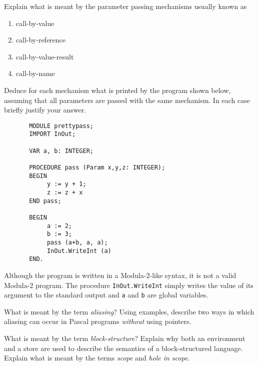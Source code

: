 \begin{questions}
\begin{subquestions}
\subquestion
        Explain what is meant by the parameter passing mechanisms usually
        known as
                \begin{enumerate}
                \item call-by-value
                \item call-by-reference
                \item call-by-value-result
                \item call-by-name
                \end{enumerate}
        Deduce for each mechanism what is printed by the 
        program shown below, assuming that all parameters are
	passed with the same mechanism.
        In each case briefly justify your answer.
\begin{verbatim}
       MODULE prettypass; 
       IMPORT InOut;

       VAR a, b: INTEGER;
 
       PROCEDURE pass (Param x,y,z: INTEGER);
       BEGIN
            y := y + 1;
            z := z + x
       END pass;
               
       BEGIN
            a := 2;
            b := 3;
            pass (a+b, a, a);
            InOut.WriteInt (a)
       END.
\end{verbatim}                   
Although the program is written in a Modula-2-like syntax, it
is not a valid Modula-2 program.  The procedure \verb"InOut.WriteInt"
simply writes the value of its argument to the standard output and
\verb"a" and \verb"b" are global variables.

\end{subquestions}






	\question

	\begin{subquestions}

		\subquestion 

What is meant by the term {\em aliasing}? Using examples,
describe two ways in which aliasing can occur in Pascal programs
{\em without} using pointers.

		\subquestion

What is meant by the term {\em block-structure}?
Explain why both an environment and a store are used to describe the semantics of
a block-structured language. Explain what is meant by
the terms {\em scope} and {\em hole in scope}.


\end{subquestions}
\end{questions}
